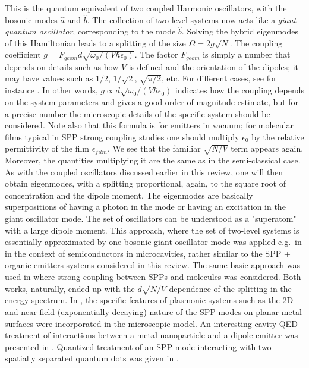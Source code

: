 \documentclass[12pt]{iopart}
\begin{document}
This is the quantum equivalent of two coupled Harmonic oscillators, with the bosonic modes $\hat{a}$ and $\hat{b}$. The collection of two-level systems now acts like a {\it giant quantum oscillator}, corresponding to the mode $\hat{b}$. Solving the hybrid eigenmodes of this Hamiltonian leads to a splitting of the size $\Omega = 2 g \sqrt{N}$. The coupling coefficient 
$g = F_{geom} d\sqrt{\omega_0/(V\hbar \epsilon_0)}$. The factor $F_{geom}$ is simply a number that depends on details such as how $V$ is defined and the orientation of the dipoles; 
it may have values such as 
$1/2$, $1/\sqrt{2}$, $\sqrt{\pi/2}$, etc. For different cases, see for instance \cite{Meystre91,Walls95,Scully97,Cohen-Tannoudji92,Agranovich2003}.
In other words, $g \propto d\sqrt{\omega_0/(V\hbar \epsilon_0)}$ indicates how the coupling depends on the system parameters and gives a good order of magnitude estimate, but for a precise number the
microscopic details of the specific system should be considered. 
Note also that this formula is for emitters in vacuum; for molecular films typical in SPP strong coupling studies one should multiply $\epsilon_0$ by the relative permittivity of the film $\epsilon_{film}$. We see that the familiar $\sqrt{N/V}$ term appears again. Moreover, the quantities multiplying it are the same as in the semi-classical case. As with the coupled oscillators discussed earlier in this review, one will then obtain eigenmodes, with a splitting proportional, again, to the square root of concentration and the dipole moment. The eigenmodes are basically superpositions of having a photon in the mode or having an excitation in the giant oscillator mode. The set of oscillators can be understood as a "superatom" with a large dipole moment. This approach, where the set of two-level systems is essentially approximated by one bosonic giant oscillator mode was applied e.g.\ in \cite{Agranovich2003} in the context of semiconductors in microcavities, rather similar to the SPP + organic emitters systems considered in this review. The same basic approach was used in \cite{Gonzalez-Tudela2013} where strong coupling between SPPs and molecules was considered. Both works, naturally, ended up with the 
$d \sqrt{N/V}$ dependence of the splitting in the energy spectrum. In \cite{Gonzalez-Tudela2013}, the specific features of plasmonic systems such as the 2D and near-field (exponentially decaying) nature of the SPP modes on planar metal surfaces were incorporated in the microscopic model. An interesting cavity QED treatment of interactions between a metal nanoparticle and a dipole emitter was presented in \cite{Waks2010}. Quantized treatment of an SPP mode interacting with two spatially separated quantum dots was given in \cite{Chen2011}.
\end{document}
